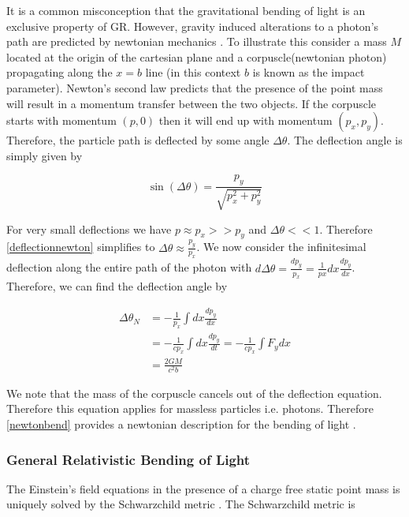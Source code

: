 It is a common misconception that the gravitational bending of light is an exclusive property of GR.
However, gravity induced alterations to a photon's path are predicted by newtonian mechanics \cite{lensingbook}. To illustrate this 
consider a mass $M$ located at the origin of the cartesian plane and a corpuscle(newtonian photon) 
propagating along the $x=b$ line (in this context $b$ is known as the impact parameter). 
Newton's second law predicts that the presence of the point mass will result in a momentum transfer
between the two objects. If the corpuscle starts with 
momentum $(p,0)$ then it will end up with momentum $(p_x,p_y)$.
Therefore, the particle path is deflected by some angle $\Delta \theta$. The deflection angle is 
simply given by 

\begin{equation}
  \sin(\Delta \theta) = \frac{p_y}{\sqrt{p_x^2+p_y^2}}
  \label{deflectionnewton}
\end{equation}


\par For very small deflections we have $p\approx p_x >> p_y$ and $\Delta \theta << 1$. 
Therefore \autoref{deflectionnewton} simplifies to $\Delta \theta
\approx \frac{p_y}{p_x}$. We now consider the infinitesimal deflection along the entire path of the photon with
$d\Delta \theta = \frac{dp_y}{p_x} = \frac{1}{px} dx \frac{dp_y}{dx}$. Therefore, we can find the deflection
angle by 

\begin{equation}
  \begin{split}
  \Delta \theta_N &= -\frac{1}{p_x} \int dx \frac{dp_y}{dx} \\
  &= -\frac{1}{cp_x} \int dx \frac{dp_y}{dt} = -\frac{1}{cp_x} \int F_y dx \\ 
  &= \frac{2GM}{c^2b}
  \end{split}  
  \label{newtonbend}
\end{equation}

We note that the mass of the corpuscle cancels out of the deflection equation. Therefore this equation applies
for massless particles i.e. photons. Therefore \autoref{newtonbend} provides a newtonian description for the 
bending of light \cite{lensingbook}.

\subsubsection{General Relativistic Bending of Light}
The Einstein's field equations in the presence of a charge free static point mass is uniquely solved by 
the Schwarzchild metric \cite{GR1}. The Schwarzchild metric is

